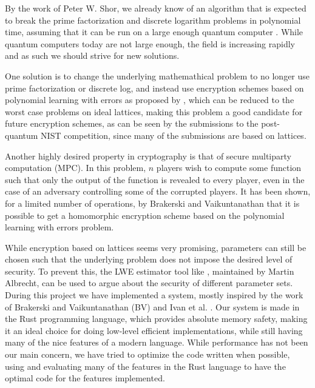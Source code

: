 \documentclass[../main.tex]{subfiles}
\begin{document}
By the work of Peter W. Shor, we already know of an algorithm that is expected to break
the prime factorization and discrete logarithm problems in polynomial time, assuming that it can be run
on a large enough quantum computer \cite{Shor_1997}.
While quantum computers today are not large enough, the field is increasing rapidly and as such
we should strive for new solutions.

One solution is to change the underlying mathemathical problem to no longer use prime factorization or
discrete log, and instead use encryption schemes based on polynomial learning with errors as proposed by \cite{IdealLatAndRLWE}, which can be reduced to the worst case problems on ideal lattices, making this problem a good candidate for future encryption schemes, as can be seen by the submissions to the post-quantum NIST competition, since many of the submissions are based on lattices.

Another highly desired property in cryptography is that of secure multiparty computation (MPC).
In this problem, $n$ players wish to compute some function such that only the output of the function
is revealed to every player, even in the case of an adversary controlling some of the corrupted players.
It has been shown, for a limited number of operations, by Brakerski and Vaikuntanathan \cite{brakerski2011fully} that it is possible to get a homomorphic encryption scheme based on the polynomial learning with errors problem.

While encryption based on lattices seems very promising, parameters can still be chosen such that the
underlying problem does not impose the desired level of security.
To prevent this, the LWE estimator tool like \cite{cryptoeprint:2015:046}, maintained by Martin Albrecht, can be used to argue about the security of different parameter sets.
\\[5mm]
During this project we have implemented a system, mostly inspired by the work of Brakerski and Vaikuntanathan (BV) \cite{brakerski2011fully} and Ivan et al. \cite{damgaard2012multiparty}.
Our system is made in the Rust programming language, which provides absolute memory safety,
making it an ideal choice for doing low-level efficient implementations, while still having many of
the nice features of a modern language.
While performance has not been our main concern, we have tried to optimize the code written when possible, using and evaluating many of the features in the Rust language to have the optimal code for the features implemented.
\end{document}
